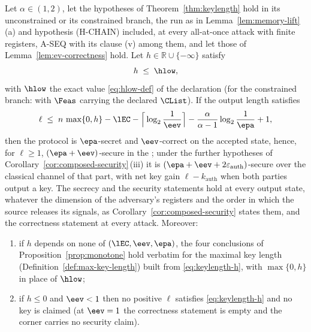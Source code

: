 \begin{corollary}\label{cor:keylength-bound}
Let $\alpha\in(1,2)$, let the hypotheses of Theorem~\ref{thm:keylength}
hold in its unconstrained or its constrained branch, the run as in
Lemma~\ref{lem:memory-lift}\,(a) and hypothesis (H-CHAIN) included, at every
all-at-once attack with finite registers, A-SEQ with its clause (v) among
them, and let those of Lemma~\ref{lem:ev-correctness} hold. Let
$h\in\mathbb{R}\cup\{-\infty\}$ satisfy
\begin{equation}\label{eq:lower-bound-h}
  h\;\le\;\hlow ,
\end{equation}
with $\hlow$ the exact value \eqref{eq:hlow-def} of the declaration (for
the constrained branch: with $\Feas$ carrying the declared $\CList$). If the
output length satisfies
\begin{equation}\label{eq:keylength-h}
  \ell\;\le\;n\,\max\{0,h\}-\lEC-\Big\lceil\log_2\frac1{\eev}\Big\rceil
  -\frac{\alpha}{\alpha-1}\log_2\frac1{\epa}+1,
\end{equation}
then the protocol is $\epa$-secret and $\eev$-correct on the accepted
state, hence, for $\ell\ge1$, $(\epa+\eev)$-secure in the
; under the further hypotheses of
Corollary~\ref{cor:composed-security}\,(iii) it is
$(\epa+\eev+2\varepsilon_{\mathrm{auth}})$-secure over the classical channel
of that part, with net key gain $\ell-k_{\mathrm{auth}}$ when both parties
output a key. The secrecy and the security statements hold at every output
state, whatever the dimension of the adversary's registers and the order in
which the source releases its signals, as
Corollary~\ref{cor:composed-security} states them, and the correctness
statement at every attack. Moreover:
\begin{enumerate}[label=(\alph*),leftmargin=2.2em]
\item if $h$ depends on none of $(\lEC,\eev,\epa)$, the four conclusions of
  Proposition~\ref{prop:monotone} hold verbatim for the maximal key length
  (Definition~\ref{def:max-key-length}) built from \eqref{eq:keylength-h},
  with $\max\{0,h\}$ in place of $\hlow$;
\item if $h\le0$ and $\eev<1$ then no positive $\ell$ satisfies
  \eqref{eq:keylength-h} and no key is claimed (at $\eev=1$ the correctness
  statement is empty and the corner carries no security claim).
\end{enumerate}
\end{corollary}

